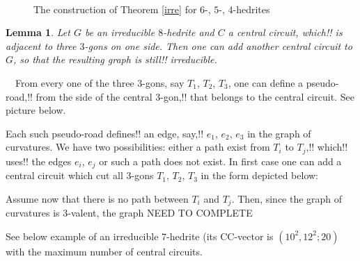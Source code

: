 \documentclass[12pt]{article}
\newtheorem{lemma}{Lemma}
\newcommand{\proof}{\noindent{\bf Proof.}\ \ }
\begin{document}

\begin{figure}
\centering
\mbox{\quad
{}\quad
{}}
\caption{The construction of Theorem \ref{irre} for $6$-, $5$-, $4$-hedrites}
\label{The456hedriteCases}
\end{figure}




\begin{lemma}
Let $G$ be an irreducible $8$-hedrite and $C$ a central circuit, 
which!! is adjacent to three $3$-gons on one side. Then one can add another central circuit to $G$, so that the resulting graph is still!! irreducible.
\end{lemma}
\proof From every one of the three $3$-gons, say $T_1$, $T_2$, $T_3$, one can define a pseudo-road,!! from the side of the central $3$-gon,!! that belongs to the central circuit. See picture below.
\begin{center}
\epsfxsize=40mm
\end{center}
Each such pseudo-road defines!! an edge, say,!! $e_1$, $e_2$, $e_3$ in the graph 
of curvatures. We have two possibilities: either a path exist from $T_i$ 
to $T_j$,!! which!! uses!! the edges $e_i$, $e_j$ or such a path does not exist. In 
first case one can add a central circuit which cut all $3$-gons $T_1$, 
$T_2$, $T_3$ in the form depicted below:
\begin{center}
\epsfxsize=40mm
\end{center}

Assume now that there is no path between $T_i$ and $T_j$. Then, since the graph of curvatures is $3$-valent, the graph NEED TO COMPLETE













See below example of an irreducible $7$-hedrite (its CC-vector is $(10^2, 12^2; 20)$ with the maximum number of central circuits.
\end{document}
